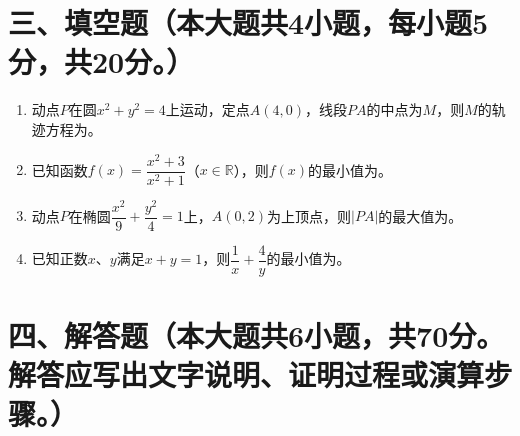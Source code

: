 \documentclass[12pt, a4paper]{ctexart}
\begin{document}
\section*{三、填空题（本大题共4小题，每小题5分，共20分。）}

\begin{enumerate}[resume]

\item 动点$P$在圆$x^2+y^2=4$上运动，定点$A(4,0)$，线段$PA$的中点为$M$，则$M$的轨迹方程为\underline{\qquad}。

\item 已知函数$f(x)=\dfrac{x^2+3}{x^2+1}$（$x\in\mathbb{R}$），则$f(x)$的最小值为\underline{\qquad}。

\item 动点$P$在椭圆$\dfrac{x^2}{9}+\dfrac{y^2}{4}=1$上，$A(0,2)$为上顶点，则$|PA|$的最大值为\underline{\qquad}。

\item 已知正数$x$、$y$满足$x+y=1$，则$\dfrac{1}{x}+\dfrac{4}{y}$的最小值为\underline{\qquad}。

\end{enumerate}

\section*{四、解答题（本大题共6小题，共70分。解答应写出文字说明、证明过程或演算步骤。）}
\end{document}
